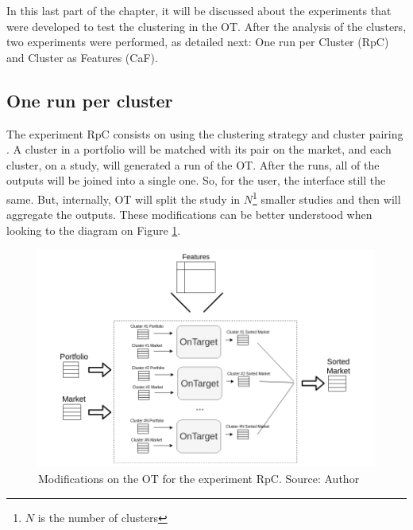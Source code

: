 \newcommand{\nameExperimentI}{RpC}
\newcommand{\nameExperimentII}{CaF}


In this last part of the chapter, it will be discussed about the experiments that were developed to test the clustering in the OT. After the analysis of the clusters, two experiments were performed, as detailed next: One run per Cluster (\nameExperimentI{}) and Cluster as Features (\nameExperimentII{}).

\subsection{One run per cluster}
\label{ch:experiment-i}

The experiment \nameExperimentI{} consists on using the clustering strategy \nameClusterStrategyA{} and cluster pairing \nameClusterPairingA{}. A cluster in a portfolio will be matched with its pair on the market, and each cluster, on a study, will generated a run of the OT. After the runs, all of the outputs will be joined into a single one. So, for the user, the interface still the same. But, internally, OT will split the study in $N$\footnote{$N$ is the number of clusters} smaller studies and then will aggregate the outputs. These modifications can be better understood when looking to the diagram on Figure \ref{fig:one-run-each-cluster}. 

\begin{figure}[h]
   \centering
   \includegraphics[width=\linewidth]{fig/ch3-one-run-each-cluster.png}
   \caption{Modifications on the OT for the experiment \nameExperimentI{}. Source: Author}
   \label{fig:one-run-each-cluster}
\end{figure}


